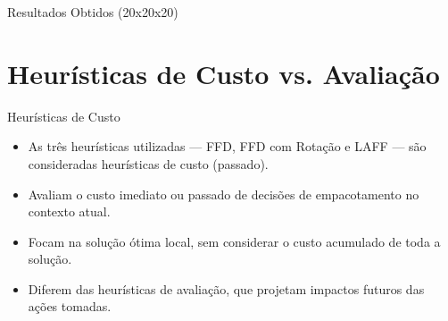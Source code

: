\documentclass{beamer}
\begin{document}
\begin{frame}{Resultados Obtidos (20x20x20)}
	\begin{table}
		\centering

		\caption{Container 20x20x20 com 15 caixas}
	\end{table}
\end{frame}

\section{Heurísticas de Custo vs. Avaliação}
\begin{frame}{Heurísticas de Custo}
	\begin{itemize}
		\item As três heurísticas utilizadas — FFD, FFD com Rotação e LAFF — são consideradas heurísticas de custo (passado).
		\item Avaliam o custo imediato ou passado de decisões de empacotamento no contexto atual.
		\item Focam na solução ótima local, sem considerar o custo acumulado de toda a solução.
		\item Diferem das heurísticas de avaliação, que projetam impactos futuros das ações tomadas.
	\end{itemize}
\end{frame}
\end{document}
